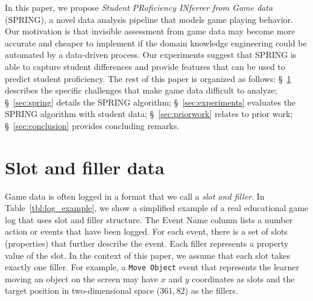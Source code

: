 \documentclass{sigchi}
\def\algname{SPRING\xspace}
\begin{document}
	
	In this paper, we propose \textit{Student PRoficiency INferrer from Game data} (SPRING), a novel data analysis pipeline that models game playing behavior.
	Our motivation is that invisible assessment from game data may become more accurate and cheaper to implement if the domain knowledge engineering could be automated by a data-driven process.
	Our experiments suggest that \algname is able to capture student differences and provide features that can be used to predict student proficiency.
	The rest of this paper is organized as follows:
	\S~\ref{sec:game_data} describes the specific challenges that make game data difficult to analyze;
	\S~\ref{sec:spring} details the SPRING algorithm;
	\S~\ref{sec:experiments} evaluates the SPRING algorithm with student data;
	\S~\ref{sec:priorwork} relates to prior work;
	\S~\ref{sec:conclusion} provides concluding remarks.
	
	
	\section{Slot and filler data}
	\label{sec:game_data}
	Game data is often logged  in a format that we call a \textit{slot and filler}.
	In Table~\ref{tbl:log_example}, we show a simplified example of a real educational game log that uses slot and filler structure.
	The Event Name column lists a number action or events that have been logged.
	For each event, there is a set of slots (properties) that further describe the event.
	Each filler represents a property value of the slot.
	In the context of this paper, we assume that each slot takes exactly one filler.
	For example, a \texttt{Move Object} event  that represents the learner moving an object on the screen may have $x$ and $y$ coordinates as slots and the target position in two-dimensional space ($361, 82$) as the fillers.
	\newline
	
\end{document}

